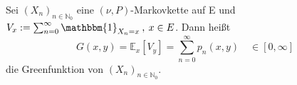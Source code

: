 Sei $(X_{n})_{n \in \mathbb{N}_{0}}$ eine $(\nu,P)$-Markovkette auf E und $V_{x} := \sum_{n=0}^{\infty} \mathbbm{1}_{X_{n} = x} \: , \: x \in E $. Dann heißt 
\begin{equation*}
G(x,y) = \mathbb{E}_{x}[V_{y}] = \sum_{n=0}^{\infty} p_{n}(x,y) \quad \in [0,\infty]
\end{equation*}
die Greenfunktion von $(X_{n})_{n \in \mathbb{N}_{0}}$.